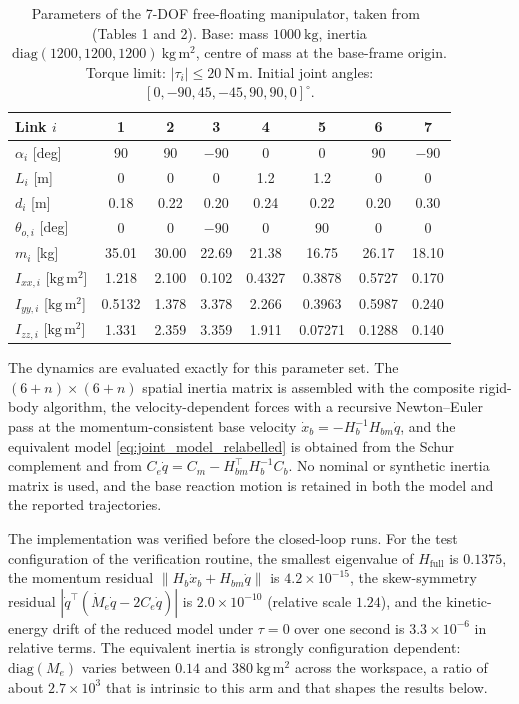 \begin{table}[t]
\centering
\caption{Parameters of the 7-DOF free-floating manipulator, taken from~\cite{dou2025fractional} (Tables 1 and 2). Base: mass $1000~\mathrm{kg}$, inertia $\mathrm{diag}(1200,1200,1200)~\mathrm{kg\,m^2}$, centre of mass at the base-frame origin. Torque limit: $|\tau_i|\le 20~\mathrm{N\,m}$. Initial joint angles: $[0,-90,45,-45,90,90,0]^\circ$.}
\label{tab:ffsm_params}
\footnotesize
\setlength{\tabcolsep}{3pt}
\begin{tabular}{lccccccc}
\toprule
Link $i$ & 1 & 2 & 3 & 4 & 5 & 6 & 7\\
\midrule
$\alpha_i$ [deg] & 90 & 90 & $-90$ & 0 & 0 & 90 & $-90$\\
$L_i$ [m]        & 0 & 0 & 0 & 1.2 & 1.2 & 0 & 0\\
$d_i$ [m]        & 0.18 & 0.22 & 0.20 & 0.24 & 0.22 & 0.20 & 0.30\\
$\theta_{o,i}$ [deg] & 0 & 0 & $-90$ & 0 & 90 & 0 & 0\\
$m_i$ [kg]       & 35.01 & 30.00 & 22.69 & 21.38 & 16.75 & 26.17 & 18.10\\
$I_{xx,i}$ [$\mathrm{kg\,m^2}$] & 1.218 & 2.100 & 0.102 & 0.4327 & 0.3878 & 0.5727 & 0.170\\
$I_{yy,i}$ [$\mathrm{kg\,m^2}$] & 0.5132 & 1.378 & 3.378 & 2.266 & 0.3963 & 0.5987 & 0.240\\
$I_{zz,i}$ [$\mathrm{kg\,m^2}$] & 1.331 & 2.359 & 3.359 & 1.911 & 0.07271 & 0.1288 & 0.140\\
\bottomrule
\end{tabular}
\end{table}

The dynamics are evaluated exactly for this parameter set. The $(6+n)\times(6+n)$ spatial inertia matrix is assembled with the composite rigid-body algorithm, the velocity-dependent forces with a recursive Newton--Euler pass at the momentum-consistent base velocity $\dot x_b=-H_b^{-1}H_{bm}\dot q$, and the equivalent model \eqref{eq:joint_model_relabelled} is obtained from the Schur complement and from $C_e\dot q=C_m-H_{bm}^\top H_b^{-1}C_b$. No nominal or synthetic inertia matrix is used, and the base reaction motion is retained in both the model and the reported trajectories.

The implementation was verified before the closed-loop runs. For the test configuration of the verification routine, the smallest eigenvalue of $H_{\mathrm{full}}$ is $0.1375$, the momentum residual $\|H_b\dot x_b+H_{bm}\dot q\|$ is $4.2\times10^{-15}$, the skew-symmetry residual $|\dot q^\top(\dot M_e\dot q-2C_e\dot q)|$ is $2.0\times10^{-10}$ (relative scale $1.24$), and the kinetic-energy drift of the reduced model under $\tau=0$ over one second is $3.3\times10^{-6}$ in relative terms. The equivalent inertia is strongly configuration dependent: $\mathrm{diag}(M_e)$ varies between $0.14$ and $380~\mathrm{kg\,m^2}$ across the workspace, a ratio of about $2.7\times10^{3}$ that is intrinsic to this arm and that shapes the results below.

